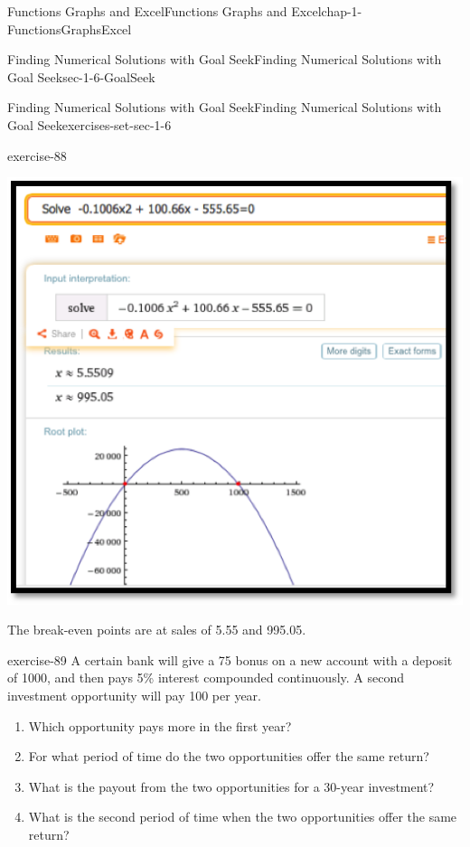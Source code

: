 \documentclass[oneside,10pt,]{book}
\numberwithin{equation}{section}
\begin{document}
\begin{chapterptx}{Functions Graphs and Excel}{}{Functions Graphs and Excel}{}{}{chap-1-FunctionsGraphsExcel}
\begin{sectionptx}{Finding Numerical Solutions with Goal Seek}{}{Finding Numerical Solutions with Goal Seek}{}{}{sec-1-6-GoalSeek}
\begin{exercises-subsection-numberless}{Finding Numerical Solutions with Goal Seek}{}{Finding Numerical Solutions with Goal Seek}{}{}{exercises-set-sec-1-6}
\begin{divisionexercise}{13}{}{}{exercise-88}
\begin{enumerate}[label=(\alph*)]
\begin{sidebyside}{1}{0.2}{0.2}{0}
\begin{sbspanel}{0.6}
\includegraphics[width=1\linewidth]{images/sec1-6-sol13b.png}
\end{sbspanel}%
\end{sidebyside}%
 The break-even points are at sales of 5.55 and 995.05.%
\end{enumerate}
\end{divisionexercise}%
\begin{divisionexercise}{14}{}{}{exercise-89}%
\hypertarget{p-530}{}%
A certain bank will give a \textdollar{}75 bonus on a new account with a deposit of \textdollar{}1000, and then pays 5\% interest compounded continuously.  A second investment opportunity will pay \textdollar{}100 per year.%
\leavevmode%
\begin{enumerate}[label=(\alph*)]
\item\hypertarget{li-149}{}\hypertarget{p-531}{}%
Which opportunity pays more in the first year?%
\item\hypertarget{li-150}{}\hypertarget{p-532}{}%
For what period of time do the two opportunities offer the same return?%
\item\hypertarget{li-151}{}\hypertarget{p-533}{}%
What is the payout from the two opportunities for a 30-year investment?%
\item\hypertarget{li-152}{}\hypertarget{p-534}{}%
What is the second period of time when the two opportunities offer the same return?%
\end{enumerate}

\end{divisionexercise}
\end{exercises-subsection-numberless}
\end{sectionptx}
\end{chapterptx}
\end{document}

